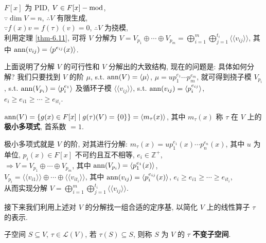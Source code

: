 \documentclass{note}
\begin{document}
$F[x]$ 为 PID, $V\in F[x]-\operatorname{mod}$,\\
$\because\dim V=n$, $\therefore V$ 有限生成,\\
$\because f(x)v=f(\tau)(v)=0$, $\therefore V$ 为挠模,\\
利用定理 \ref{thm-6.11}, 可将 $V$ 分解为 $V=V_{p_1}\oplus\cdots\oplus V_{p_m}=\bigoplus_{i=1}^m\bigoplus_{j=1}^{t_i}\langle\langle v_{ij}\rangle\rangle$, 其中 $\operatorname{ann}(v_{ij})=\langle p^{e_{ij}}(x)\rangle$.

上面说明了分解 $V$ 的可行性和 $V$ 分解出的大致结构, 现在的问题是: 具体如何分解? 我们只要找到 $V$ 的阶 $\mu$, s.t. $\operatorname{ann}(V)=\langle\mu\rangle$, $\mu=up_1^{e_1}\cdots p_m^{e_m}$, 就可得到挠子模 $V_{p_i}$, s.t. $\operatorname{ann}(V_{p_i})=\langle p_i^{e_1}\rangle$ 及循环子模 $\langle\langle v_{ij}\rangle\rangle$, s.t. $\operatorname{ann}(v_{ij})=\langle p_i^{e_{ij}}\rangle$, $e_i\geq e_{i1}\geq\cdots\geq e_{it_i}$.

\begin{df}[极小多项式]
    $\operatorname{ann}(V)=\{g(x)\in F[x]\mid g(\tau)(V)=\{0\}\}=\langle m_{\tau}(x)\rangle$, 其中 $m_{\tau}(x)$ 称 $\tau$ 在 $V$ 上的\textbf{极小多项式}, 首系数 $=1$.
\end{df}

极小多项式就是 $V$ 的阶, 对其进行分解: $m_{\tau}(x)=up_1^{e_1}(x)\cdots p_n^{e_n}(x)$, 其中 $u$ 为单位, $p_i(x)\in F[x]$ 不可约且互不相等, $e_i\in\mathbb{Z}^+$,\\
$\Longrightarrow V=V_{p_1}\oplus\cdots\oplus V_{p_m}$, 其中 $\operatorname{ann}(V_{p_i})=\langle p_1^{e_1}(x)\rangle$,\\
$V_{p_i}=\langle\langle v_{i1}\rangle\rangle\oplus\cdots\oplus\langle\langle v_{it_i}\rangle\rangle$, 其中 $\operatorname{ann}(v_{ij})=\langle p_i^{e_{ij}}(x)\rangle$, $e_i\geq e_{i1}\geq\cdots\geq e_{it_i}$,\\
从而实现分解 $V=\bigoplus_{i=1}^m\bigoplus_{j=1}^{t_i}\langle\langle v_{ij}\rangle\rangle$.

接下来我们利用上述对 $V$ 的分解找一组合适的定序基, 以简化 $V$ 上的线性算子 $\tau$ 的表示.

\begin{df}[不变子空间]
    子空间 $S\subseteq V$, $\tau\in\mathcal{L}(V)$, 若 $\tau(S)\subseteq S$, 则称 $S$ 为 $V$ 的 $\tau$ \textbf{不变子空间}.
\end{df}
\end{document}
